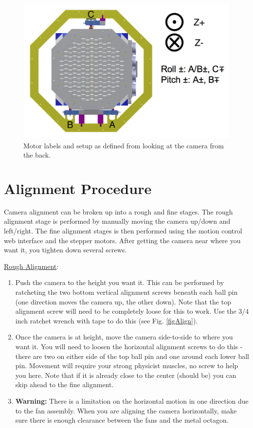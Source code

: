\documentclass[11pt]{article}
\begin{document}
\begin{figure}[h]
\begin{center}
\includegraphics[width = 4.5in]{camerapicNew.png}
\caption{Motor labels and setup as defined from looking at the camera from the back.}  
\label{fd2}
\end{center}
\end{figure}


\section{Alignment Procedure}
\label{alignSec}

Camera alignment can be broken up into a rough and fine stages.
The rough alignment stage is performed by manually moving the camera up/down and left/right.
The fine alignment stages is then performed using the motion control web interface and the stepper motors.
After getting the camera near where you want it, you tighten down several screws.

\underline{Rough Alignment}:
\begin{enumerate}
	\item Push the camera to the height you want it.  
		This can be performed by ratcheting the two bottom vertical alignment screws beneath each ball pin (one direction moves the camera up, the other down).
		Note that the top alignment screw will need to be completely loose for this to work. 
		Use the 3/4 inch ratchet wrench with tape to do this (see Fig. \ref{figAlign}).
	\item Once the camera is at height, move the camera side-to-side to where you want it.
		You will need to loosen the horizontal alignment screws to do this - there are two on either side of the top ball pin and one around each lower ball pin.
		Movement will require your strong physicist muscles, no screw to help you here.
		Note that if it is already close to the center (should be) you can skip ahead to the fine alignment.
	\item {\bf Warning: }  There is a limitation on the horizontal motion in one direction due to the fan assembly.  
		When you are aligning the camera horizontally, make sure there is enough clearance between the fans and the metal octagon.
\end{enumerate}
\end{document}
